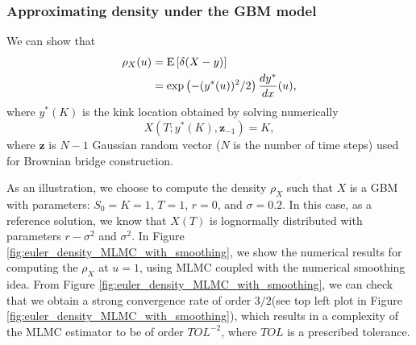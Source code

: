 \subsubsection{Approximating density under the GBM model}\label{sec:Approximating density under the GBM model}

We can show that 
\begin{align}
\rho_{X}(u)&=\mathrm{E}\left[\delta(X-y)\right]\nonumber\\
&=\exp\left(-(y^\ast(u))^2/2\right) \frac{d y^\ast}{dx}(u),
\end{align}
where $y^\ast(K)$ is the kink location obtained by solving numerically 
$$X(T; y^\ast(K), \mathbf{z}_{-1})=K,$$
where  $\mathbf{z}$ is $N-1$ Gaussian random  vector ($N$ is the number of time steps) used for Brownian bridge construction.

As an illustration, we choose to compute the density $\rho_{X}$  such that $X$ is a GBM with parameters: $S_0=K=1$, $T=1$, $r=0$, and $\sigma=0.2$. In this case, as a reference solution,  we know that $X(T)$ is lognormally distributed with parameters $r-\sigma^2$ and $\sigma^2$. In Figure \ref{fig:euler_density_MLMC_with_smoothing}, we show the numerical results  for computing the $\rho_{X}$ at $u=1$, using  MLMC coupled with the numerical smoothing idea. From Figure \ref{fig:euler_density_MLMC_with_smoothing}, we can check that we obtain a strong convergence rate of order $3/2$(see  top left plot in Figure \ref{fig:euler_density_MLMC_with_smoothing}), which results in a complexity of the MLMC estimator to be of order $TOL^{-2}$, where $TOL$ is a prescribed tolerance.



